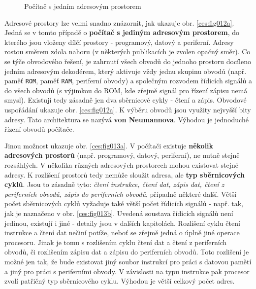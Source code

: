       \begin{figure}[ht!]
        \centering  
        \newline
        \caption{Počítač s jedním adresovým prostorem}
      \end{figure}
            
      Adresové prostory lze velmi snadno znázornit, jak ukazuje obr. \ref{ces:fig012a}. Jedná 
      se v tomto případě o \textbf{počítač s jediným adresovým prostorem}, do kterého jsou vloženy 
      dílčí prostory  - programový, datový a periferní. Adresy rostou směrem zdola nahoru (v 
      některých publikacích je zvolen opačný směr). Co se týče obvodového řešení, je zahrnutí všech 
      obvodů do jednoho prostoru docíleno jedním adresovým dekodérem, který aktivuje vždy jednu 
      skupinu obvodů (např. paměť \texttt{ROM}, paměť \texttt{RAM}, periferní obvody) a společným 
      rozvodem řídicích signálů  a   do všech obvodů (s výjimkou do ROM, 
      kde zřejmě signál  pro řízení zápisu nemá smysl). Existují tedy 
      zásadně jen dva sběrnicové cykly - čtení a zápis. Obvodové uspořádání ukazuje obr. 
      \ref{ces:fig012a}. K výběru obvodů jsou využity nejvyšší bity adresy. Tato architektura 
      se nazývá \textbf{von Neumannova}. Výhodou je jednoduché řízení obvodů počítače.

      Jinou možnost ukazuje obr. \ref{ces:fig013a}. V počítači existuje \textbf{několik 
      adresových prostorů} (např. programový, datový, periferní), ne nutně stejně rozsáhlých. V 
      několika různých adresových prostorech mohou existovat stejné adresy. K rozlišení prostorů 
      tedy nemůže sloužit adresa, ale \textbf{typ sběrnicových cyklů}. Jsou to zásadně tyto: 
      \emph{čtení instrukce, čtení dat, zápis dat, čtení z periferních obvodů, zápis do periferních 
      obvodů}, případně některé další. Větší počet sběrnicových cyklů vyžaduje také větší počet 
      řídicích signálů - např. tak, jak je naznačeno v obr. \ref{ces:fig013b}. Uvedená 
      soustava řídicích signálů není jedinou, existují i jiné - detaily jsou v dalších kapitolách. 
      Rozlišení cyklu čtení instrukce a čtení dat nečiní potíže, neboť se zřejmě jedná o úplně jiné 
      operace procesoru. Jinak je tomu s rozlišením cyklu čtení dat a čtení z periferních    
      obvodů, či rozlišením zápisu dat a zápisu do periferních obvodů. Toto rozlišení je možné jen 
      tak, že bude existovat jiný soubor instrukcí pro práci s datovou pamětí a jiný pro práci s 
      periferními obvody. V závislosti na typu instrukce pak procesor zvolí patřičný typ 
      sběrnicového cyklu. Výhodou je větší celkový počet adres.
      
